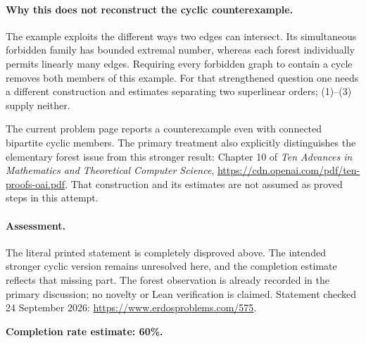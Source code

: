 \paragraph{Why this does not reconstruct the cyclic counterexample.}
The example exploits the different ways two edges can intersect. Its simultaneous forbidden family has bounded extremal number, whereas each forest individually permits linearly many edges. Requiring every forbidden graph to contain a cycle removes both members of this example. For that strengthened question one needs a different construction and estimates separating two superlinear orders; (1)--(3) supply neither.

The current problem page reports a counterexample even with connected bipartite cyclic members. The primary treatment also explicitly distinguishes the elementary forest issue from this stronger result: Chapter 10 of \emph{Ten Advances in Mathematics and Theoretical Computer Science}, \url{https://cdn.openai.com/pdf/ten-proofs-oai.pdf}. That construction and its estimates are not assumed as proved steps in this attempt.

\paragraph{Assessment.}
The literal printed statement is completely disproved above. The intended stronger cyclic version remains unresolved here, and the completion estimate reflects that missing part. The forest observation is already recorded in the primary discussion; no novelty or Lean verification is claimed. Statement checked 24 September 2026: \url{https://www.erdosproblems.com/575}.

\textbf{Completion rate estimate: 60\%.}
